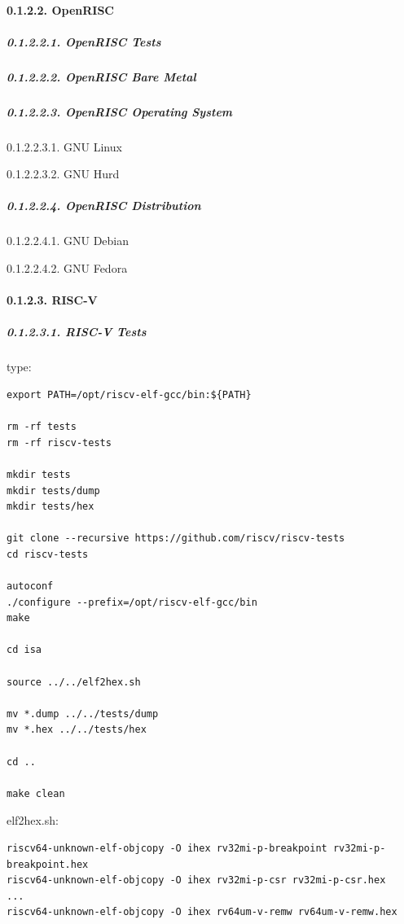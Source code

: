 \documentclass[
]{article}
\begin{document}
\hypertarget{openrisc-3}{%
\paragraph{0.1.2.2. OpenRISC}\label{openrisc-3}}

\hypertarget{openrisc-tests-1}{%
\subparagraph{0.1.2.2.1. OpenRISC Tests}\label{openrisc-tests-1}}

\hypertarget{openrisc-bare-metal-1}{%
\subparagraph{0.1.2.2.2. OpenRISC Bare
Metal}\label{openrisc-bare-metal-1}}

\hypertarget{openrisc-operating-system-1}{%
\subparagraph{0.1.2.2.3. OpenRISC Operating
System}\label{openrisc-operating-system-1}}

0.1.2.2.3.1. GNU Linux

0.1.2.2.3.2. GNU Hurd

\hypertarget{openrisc-distribution-1}{%
\subparagraph{0.1.2.2.4. OpenRISC
Distribution}\label{openrisc-distribution-1}}

0.1.2.2.4.1. GNU Debian

0.1.2.2.4.2. GNU Fedora

\hypertarget{risc-v-3}{%
\paragraph{0.1.2.3. RISC-V}\label{risc-v-3}}

\hypertarget{risc-v-tests-1}{%
\subparagraph{0.1.2.3.1. RISC-V Tests}\label{risc-v-tests-1}}

type:

\begin{verbatim}
export PATH=/opt/riscv-elf-gcc/bin:${PATH}

rm -rf tests
rm -rf riscv-tests

mkdir tests
mkdir tests/dump
mkdir tests/hex

git clone --recursive https://github.com/riscv/riscv-tests
cd riscv-tests

autoconf
./configure --prefix=/opt/riscv-elf-gcc/bin
make

cd isa

source ../../elf2hex.sh

mv *.dump ../../tests/dump
mv *.hex ../../tests/hex

cd ..

make clean
\end{verbatim}

elf2hex.sh:

\begin{verbatim}
riscv64-unknown-elf-objcopy -O ihex rv32mi-p-breakpoint rv32mi-p-breakpoint.hex
riscv64-unknown-elf-objcopy -O ihex rv32mi-p-csr rv32mi-p-csr.hex
...
riscv64-unknown-elf-objcopy -O ihex rv64um-v-remw rv64um-v-remw.hex
\end{verbatim}
\end{document}
